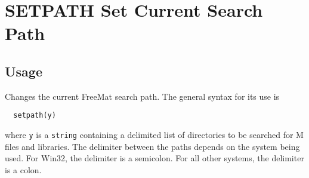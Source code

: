 \section{SETPATH Set Current Search Path}

\subsection{Usage}

Changes the current FreeMat search path.  The general syntax for
its use is
\begin{verbatim}
  setpath(y)
\end{verbatim}
where \verb|y| is a \verb|string| containing a delimited list of directories
to be searched for M files and libraries.  
The delimiter between the paths depends on the system being used.  For Win32, the
delimiter is a semicolon.  For all other systems, the delimiter is a colon.

